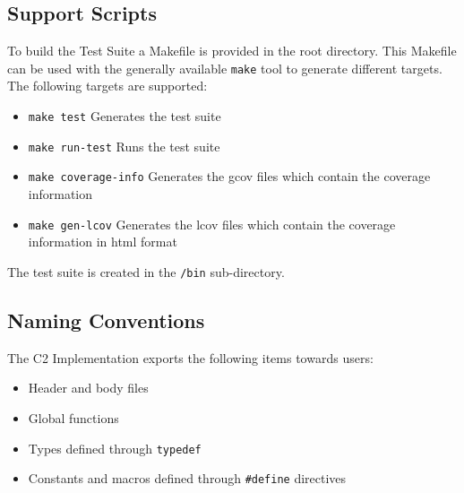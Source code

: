 \documentclass{pnp_article}
\begin{document}

\subsection{Support Scripts}\label{sec:script}
To build the Test Suite a Makefile is provided in the root directory. This Makefile can be used with the generally available \texttt{make} tool to generate different targets. The following targets are supported:

\begin{itemize}
\item \texttt{make test} Generates the test suite
\item \texttt{make run-test} Runs the test suite
\item \texttt{make coverage-info} Generates the gcov files which contain the coverage information
\item \texttt{make gen-lcov} Generates the lcov files which contain the coverage information in html format
\end{itemize}

The test suite is created in the \texttt{/bin} sub-directory.


\subsection{Naming Conventions}
The C2 Implementation exports the following items towards users:

\begin{itemize}
\item Header and body files
\item Global functions
\item Types defined through \texttt{typedef} 
\item Constants and macros defined through \texttt{\#define} directives
\end{itemize}
\end{document}
